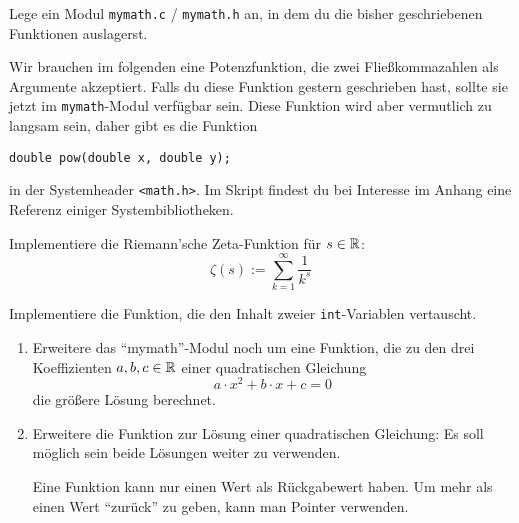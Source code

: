 \documentclass{uebungszettel}
\begin{document}
\begin{aufg} Lege ein Modul \verb|mymath.c| / \verb|mymath.h| an, in dem du die bisher geschriebenen Funktionen auslagerst.
\end{aufg}

Wir brauchen im folgenden eine Potenzfunktion, die zwei Fließkommazahlen als Argumente akzeptiert. Falls du diese Funktion gestern geschrieben hast, sollte sie jetzt im \verb|mymath|-Modul verfügbar sein. Diese Funktion wird aber vermutlich zu langsam sein, daher gibt es die Funktion 

\begin{verbatim}
double pow(double x, double y);
\end{verbatim}

in der Systemheader \verb|<math.h>|. Im Skript findest du bei Interesse im Anhang eine Referenz einiger Systembibliotheken.

\begin{aufg}
Implementiere die Riemann'sche Zeta-Funktion für $s \in \mathbb{R}$: $$
\zeta(s) := \sum_{k=1}^\infty \frac{1}{k^s} $$
\end{aufg}

\begin{aufg}
Implementiere die Funktion, die den Inhalt zweier \verb|int|-Variablen vertauscht.
\end{aufg}

\begin{aufg}
\begin{enumerate}[leftmargin=*]
\item Erweitere das "`mymath"'-Modul noch um eine Funktion, die zu den drei Koeffizienten $a, b, c \in \mathbb{R}$ einer quadratischen Gleichung $$
a \cdot x^2 + b \cdot x + c = 0 $$
die größere Lösung berechnet.
\item Erweitere die Funktion zur Lösung einer quadratischen Gleichung: Es soll möglich sein beide Lösungen weiter zu verwenden. 

Eine Funktion kann nur einen Wert als Rückgabewert haben. Um mehr als einen Wert ``zurück'' zu geben, kann man Pointer verwenden.
\end{enumerate}
\end{aufg}
\end{document}
